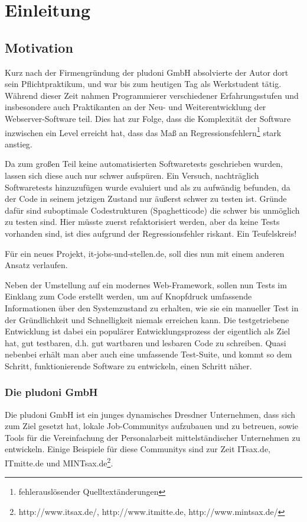 

\section{Einleitung}
\subsection{Motivation}

Kurz nach der Firmengründung der pludoni GmbH absolvierte der Autor dort sein Pflichtpraktikum, und war bis zum heutigen Tag als Werkstudent tätig.
Während dieser Zeit nahmen Programmierer verschiedener Erfahrungsstufen und insbesondere auch Praktikanten an der Neu- und Weiterentwicklung der Webserver-Software teil. Dies hat zur Folge, dass die Komplexität der Software inzwischen ein Level erreicht hat, dass das Maß an Regressionsfehlern\footnote{fehlerauslösender Quelltextänderungen} stark anstieg. 

Da zum großen Teil keine automatisierten Softwaretests geschrieben wurden, lassen sich diese auch nur schwer aufspüren. Ein Versuch, nachträglich Softwaretests hinzuzufügen wurde evaluiert und als zu aufwändig befunden, da der Code in seinem jetzigen Zustand nur äußerst schwer zu testen ist. Gründe dafür sind suboptimale Codestrukturen (Spaghetticode) die schwer bis unmöglich zu testen sind. Hier müsste zuerst refaktorisiert werden, aber da keine Tests vorhanden sind, ist dies aufgrund der Regressionsfehler riskant. Ein Teufelskreis!

Für ein neues Projekt, it-jobs-und-stellen.de, soll dies nun mit einem anderen Ansatz verlaufen. 

Neben der Umstellung auf ein modernes Web-Framework, sollen nun Tests im Einklang zum Code erstellt werden, um auf Knopfdruck  umfassende Informationen über den Systemzustand zu erhalten, wie sie ein manueller Test in der Gründlichkeit und Schnelligkeit niemals erreichen kann. Die testgetriebene Entwicklung ist dabei ein populärer Entwicklungsprozess der eigentlich als Ziel hat, gut testbaren, d.h. gut wartbaren und lesbaren Code zu schreiben. Quasi nebenbei erhält man aber auch eine umfassende Test-Suite, und kommt so dem Schritt, funktionierende Software zu entwickeln, einen Schritt näher.

\subsubsection{Die pludoni GmbH}

Die pludoni GmbH ist ein junges dynamisches Dresdner Unternehmen, dass sich zum Ziel gesetzt hat, lokale Job-Communitys aufzubauen und zu betreuen, sowie Tools für die Vereinfachung der Personalarbeit mittelständischer Unternehmen zu entwickeln. Einige Beispiele für diese Communitys sind zur Zeit ITsax.de, ITmitte.de und MINTsax.de\footnote{http://www.itsax.de/, http://www.itmitte.de, http://www.mintsax.de/}.
